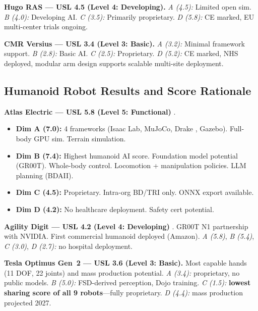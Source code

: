 \documentclass[11pt,a4paper]{article}
\begin{document}
\textbf{Hugo RAS --- USL 4.5 (Level 4: Developing).} \textit{A (4.5):} Limited open sim. \textit{B (4.0):} Developing AI. \textit{C (3.5):} Primarily proprietary. \textit{D (5.8):} CE marked, EU multi-center trials ongoing.

\textbf{CMR Versius --- USL 3.4 (Level 3: Basic).} \textit{A (3.2):} Minimal framework support. \textit{B (2.8):} Basic AI. \textit{C (2.5):} Proprietary. \textit{D (5.2):} CE marked, NHS deployed, modular arm design supports scalable multi-site deployment.

\subsection{Humanoid Robot Results and Score Rationale}

\textbf{Atlas Electric --- USL 5.8 (Level 5: Functional)} \cite{atlas2024}.
\begin{itemize}
  \item \textbf{Dim A (7.0):} 4 frameworks (Isaac Lab, MuJoCo, Drake \cite{drake2024}, Gazebo). Full-body GPU sim. Terrain simulation.
  \item \textbf{Dim B (7.4):} Highest humanoid AI score. Foundation model potential (GR00T). Whole-body control. Locomotion + manipulation policies. LLM planning (BDAII).
  \item \textbf{Dim C (4.5):} Proprietary. Intra-org BD/TRI only. ONNX export available.
  \item \textbf{Dim D (4.2):} No healthcare deployment. Safety cert potential.
\end{itemize}

\textbf{Agility Digit --- USL 4.2 (Level 4: Developing)} \cite{digit2024}. GR00T N1 \cite{groot2026} partnership with NVIDIA. First commercial humanoid deployed (Amazon). \textit{A (5.8)}, \textit{B (5.4)}, \textit{C (3.0)}, \textit{D (2.7):} no hospital deployment.

\textbf{Tesla Optimus Gen~2 --- USL 3.6 (Level 3: Basic).} Most capable hands (11 DOF, 22 joints) and mass production potential. \textit{A (3.4):} proprietary, no public models. \textit{B (5.0):} FSD-derived perception, Dojo training. \textit{C (1.5):} \textbf{lowest sharing score of all 9 robots}---fully proprietary. \textit{D (4.4):} mass production projected 2027.
\end{document}
